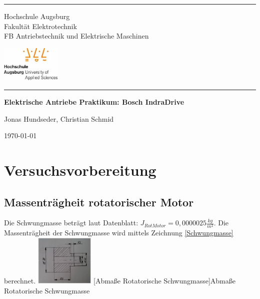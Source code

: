 \documentclass[10pt,a4paper,oneside,abstracton]{scrartcl}
\begin{document}
\begin{titlepage}
\par\noindent\rule{\textwidth}{0.4pt}

\noindent\begin{minipage}{0.5\textwidth}%
		Hochschule Augsburg  \\ 
	Fakultät Elektrotechnik \\
	FB Antriebstechnik und Elektrische Maschinen  
	\end{minipage}%
	\hfill%
	\begin{minipage}{0.5\textwidth}\raggedleft
		\includegraphics[width=80pt]{./Bilder/hsLogo.jpeg}	
	\end{minipage}

	\par\noindent\rule{\textwidth}{0.4pt}
	\centering
	\vspace*{\fill}

    \vspace*{0.5cm}

    \huge\bfseries
    Elektrische Antriebe Praktikum:
	Bosch IndraDrive

    \vspace*{0.5cm}

    \large Jonas Hundseder, Christian Schmid
	
    \vspace*{\fill}
	\today
\end{titlepage}

\tableofcontents
\clearpage


\section{Versuchsvorbereitung}
\subsection{Massenträgheit rotatorischer Motor}
Die Schwungmasse beträgt laut Datenblatt: 
$ J_{Rot Motor} = 0,000 002 5 \frac{kg}{m^2}$. 
\newline
Die Massenträgheit der Schwungmasse wird mittels Zeichnung \ref*{Schwungmasse} berechnet.
	\includegraphics[width=80pt]{./Bilder/Rot_Masse.png}
[Abmaße Rotatorische Schwungmasse]{Abmaße Rotatorische Schwungmasse \label{Schwungmasse}} 
\end{document}
